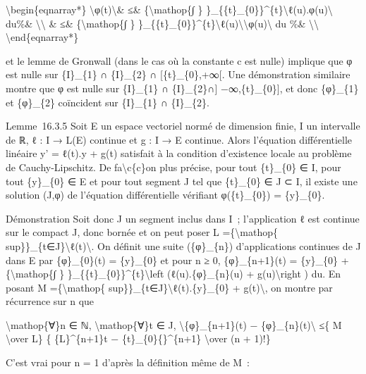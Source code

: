 \documentclass[]{article}
\begin{document}
\textbackslash{}begin\{eqnarray*\}
\textbackslash{}\textbar{}φ(t)\textbackslash{}\textbar{}\& ≤\&
\{\textbackslash{}mathop\{∫ \}
\}\_\{\{t\}\_\{0\}\}\^{}\{t\}\textbackslash{}\textbar{}ℓ(u).φ(u)\textbackslash{}\textbar{}
du\%\& \textbackslash{}\textbackslash{} \& ≤\&
\{\textbackslash{}mathop\{∫ \}
\}\_\{\{t\}\_\{0\}\}\^{}\{t\}\textbackslash{}\textbar{}ℓ(u)\textbackslash{}\textbar{}\textbackslash{}\textbar{}φ(u)\textbackslash{}\textbar{}
du \%\& \textbackslash{}\textbackslash{}
\textbackslash{}end\{eqnarray*\}

et le lemme de Gronwall (dans le cas où la constante c est nulle)
implique que φ est nulle sur \{I\}\_\{1\} ∩ \{I\}\_\{2\} ∩
{[}\{t\}\_\{0\},+∞{[}. Une démonstration similaire montre que φ est
nulle sur \{I\}\_\{1\} ∩ \{I\}\_\{2\}∩{]} −∞,\{t\}\_\{0\}{]}, et donc
\{φ\}\_\{1\} et \{φ\}\_\{2\} coïncident sur \{I\}\_\{1\} ∩ \{I\}\_\{2\}.

Lemme~16.3.5 Soit E un espace vectoriel normé de dimension finie, I un
intervalle de ℝ, ℓ : I → L(E) continue et g : I → E continue. Alors
l'équation différentielle linéaire y' = ℓ(t).y + g(t) satisfait à la
condition d'existence locale au problème de Cauchy-Lipschitz. De
fa\textbackslash{}c\{c\}on plus précise, pour tout \{t\}\_\{0\} ∈ I,
pour tout \{y\}\_\{0\} ∈ E et pour tout segment J tel que \{t\}\_\{0\} ∈
J ⊂ I, il existe une solution (J,φ) de l'équation différentielle
vérifiant φ(\{t\}\_\{0\}) = \{y\}\_\{0\}.

Démonstration Soit donc J un segment inclus dans I~; l'application ℓ est
continue sur le compact J, donc bornée et on peut poser L
=\{\textbackslash{}mathop\{
sup\}\}\_\{t∈J\}\textbackslash{}\textbar{}ℓ(t)\textbackslash{}\textbar{}.
On définit une suite (\{φ\}\_\{n\}) d'applications continues de J dans E
par \{φ\}\_\{0\}(t) = \{y\}\_\{0\} et pour n ≥ 0, \{φ\}\_\{n+1\}(t) =
\{y\}\_\{0\} +\{\textbackslash{}mathop\{∫ \}
\}\_\{\{t\}\_\{0\}\}\^{}\{t\}\textbackslash{}left (ℓ(u).\{φ\}\_\{n\}(u)
+ g(u)\textbackslash{}right ) du. En posant M
=\{\textbackslash{}mathop\{
sup\}\}\_\{t∈J\}\textbackslash{}\textbar{}ℓ(t).\{y\}\_\{0\} +
g(t)\textbackslash{}\textbar{}, on montre par récurrence sur n que

\textbackslash{}mathop\{∀\}n ∈ ℕ, \textbackslash{}mathop\{∀\}t ∈ J,
\textbackslash{}\textbar{}\{φ\}\_\{n+1\}(t) −
\{φ\}\_\{n\}(t)\textbackslash{}\textbar{} ≤\{ M \textbackslash{}over L\}
\{ \{L\}\^{}\{n+1\}\textbar{}t − \{t\}\_\{0\}\{\textbar{}\}\^{}\{n+1\}
\textbackslash{}over (n + 1)!\}

C'est vrai pour n = 1 d'après la définition même de M~:
\end{document}
